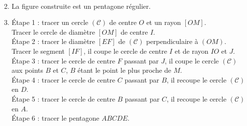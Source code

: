 \ \\ [-5mm]
   \begin{enumerate}
      \setcounter{enumi}{1}
      \item La figure construite est un {\blue pentagone régulier}.
      \item Étape 1 : tracer un cercle $(\mathcal{C})$ de centre $O$ et un rayon $[OM]$. \\
         Tracer le cercle de diamètre $[OM]$ de centre $I$. \\
         Étape 2 : tracer le diamètre $[EF]$ de $(\mathcal{C})$ perpendiculaire à $(OM)$. \\
         Tracer le segment $[IF]$, il coupe le cercle de centre $I$ et de rayon $IO$ et $J$. \\
         Étape 3 : tracer le cercle de centre $F$ passant par $J$, il coupe le cercle $(\mathcal{C})$ aux points $B$ et $C$, $B$ étant le point le plus proche de $M$. \\
         Étape 4 : tracer le cercle de centre $C$ passant par $B$, il recoupe le cercle $(\mathcal{C})$ en $D$. \\
         Étape 5 : tracer le cercle de centre $B$ passant par $C$, il recoupe le cercle $(\mathcal{C})$ en $A$. \\
         Étape 6 : tracer le pentagone $ABCDE$.
   \end{enumerate}
